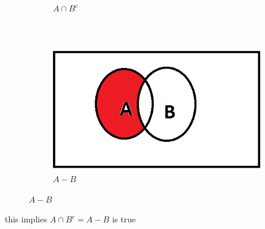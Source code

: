 \documentclass[a4paper,11pt]{article}
\begin{document}
\begin{figure}[h]
\begin{subfigure}[b]{0.25\textwidth}
        \caption{$A \cap B^c$}
    \end{subfigure}
 ~
    \begin{subfigure}[b]{0.25\textwidth}
        \includegraphics[width=\textwidth]{A-B}
        \caption{$A-B$}
        \label{fig:mouse}
    \end{subfigure}
\end{figure}
this implies $A \cap B^c = A-B$ is true
\end{document}
